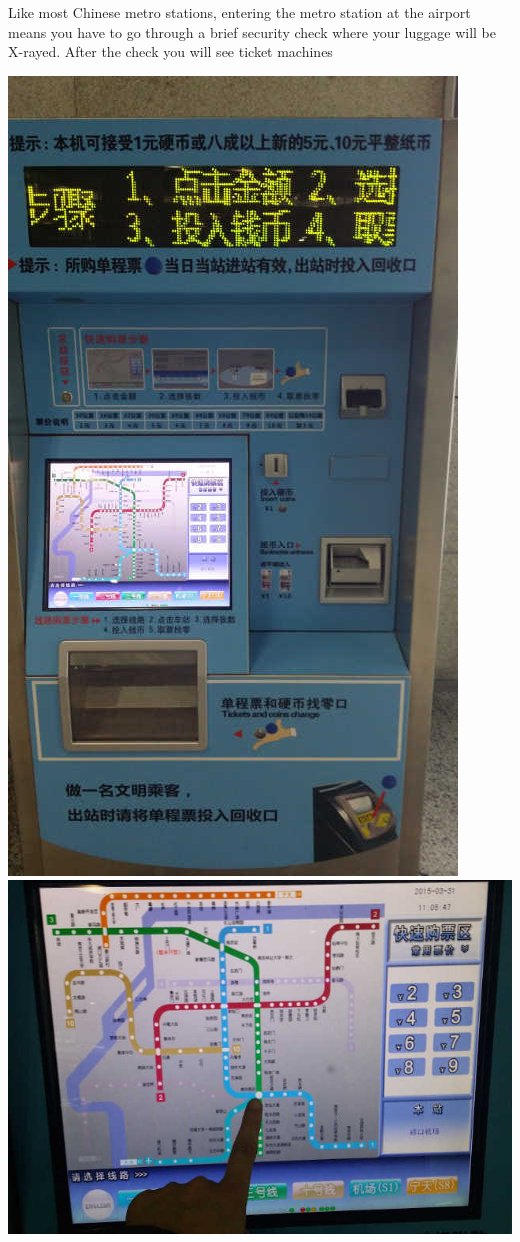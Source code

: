 \documentclass[11pt]{report}
\begin{document}
Like most Chinese metro stations, entering the metro station
at the airport means you have to go through a brief security
check where your luggage will be X-rayed. After the check you
will see ticket machines

\begin{center}
\includegraphics[scale=0.27]{travel_guide/20150331_110412.jpg}
\hspace{4mm}
\includegraphics[scale=0.27]{travel_guide/20150331_110548.jpg}
\end{center}
\end{document}
